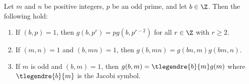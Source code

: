         \begin{proposition}\label{prop:quadratic_Gauss_sum_reduction}
          Let $m$ and $n$ be positive integers, $p$ be an odd prime, and let $b \in \Z$. Then the following hold:
          \begin{enumerate}[label=(\roman*)]
            \item If $(b,p) = 1$, then $g(b,p^{r}) = pg(b,p^{r-2})$ for all $r \in \Z$ with $r \ge 2$.
            \item If $(m,n) = 1$ and $(b,mn) = 1$, then $g(b,mn) = g(bn,m)g(bm,n)$.
            \item If $m$ is odd and $(b,m) = 1$, then $g(b,m) = \tlegendre{b}{m}g(m)$ where $\tlegendre{b}{m}$ is the Jacobi symbol.
          \end{enumerate}
        \end{proposition}
